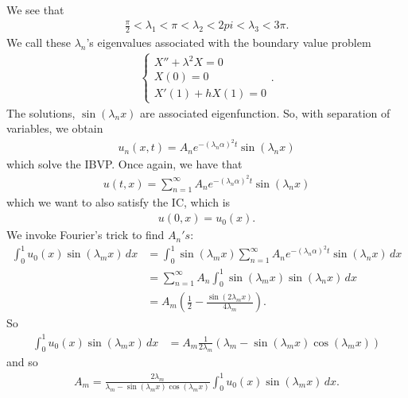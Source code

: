 \documentclass{article}
\theoremstyle{definition}
\begin{document}
We see that
\begin{align*}
\frac{\pi}{2} < \lambda_1 < \pi < \lambda_2 < 2pi < \lambda_3 < 3\pi.
\end{align*}
We call these $\lambda_n$'s eigenvalues associated with the boundary value problem
\begin{align}
\begin{cases}
X'' + \lambda^2 X = 0\\
X(0) = 0\\
X'(1) + hX(1) = 0
\end{cases}.
\end{align}
The solutions, $\sin(\lambda_n x)$ are associated eigenfunction. So, with separation of variables, we obtain
\begin{align*}
u_n(x,t) = A_n e^{-(\lambda_n\alpha)^2t}\sin(\lambda_n x)
\end{align*}
which solve the IBVP. Once again, we have that
\begin{align*}
u(t,x) = \sum_{n=1}^{\infty} A_n e^{-(\lambda_n\alpha)^2t}\sin(\lambda_n x)
\end{align*}
which we want to also satisfy the IC, which is 
\begin{align*}
u(0,x) = u_0(x).
\end{align*}
We invoke Fourier's trick to find $A_n's$:
\begin{align*}
\int_{0}^1 u_0(x)\sin(\lambda_m x)\,dx &= \int_{0}^1 \sin(\lambda_m x)\sum_{n=1}^{\infty} A_n e^{-(\lambda_n\alpha)^2t}\sin(\lambda_n x)\,dx\\
&= \sum_{n=1}^\infty A_n\int_{0}^1 \sin(\lambda_m x)\sin(\lambda_n x)\,dx\\
&= A_m \left( \frac{1}{2} - \frac{\sin(2\lambda_m x)}{4\lambda_m} \right).
\end{align*}
So
\begin{align*}
\int_{0}^1 u_0(x)\sin(\lambda_m x) \,dx &= A_m \frac{1}{2\lambda_m}\left( \lambda_m - \sin(\lambda_m x)\cos(\lambda_m x) \right)
\end{align*}
and so
\begin{align*}
A_m = \frac{2\lambda_m}{\lambda_m - \sin(\lambda_m x)\cos(\lambda_m x)}\int_{0}^1 u_0(x)\sin(\lambda_m x) \,dx.
\end{align*}
\end{document}

